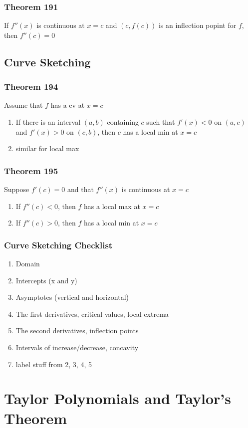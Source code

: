 \documentclass[12pt, letterpaper]{article}
\begin{document}
\subsubsection*{Theorem 191}
If $f''(x)$ is continuous at $x=c$ and $(c,f(c))$ is an inflection popint for $f$, then $f''(c) = 0$
\subsection{Curve Sketching}
\subsubsection*{Theorem 194}
Assume that $f$ has a cv at $x=c$
\begin{enumerate}
    \item If there is an interval $(a,b)$ containing $c$ such that $f'(x) < 0$ on $(a,c)$ and $f'(x) > 0$ on $(c,b)$, then $c$ has a local min at $x=c$
    \item similar for local max
\end{enumerate}
\subsubsection*{Theorem 195}
Suppose $f'(c) = 0$ and that $f''(x)$ is continuous at $x=c$
\begin{enumerate}
    \item If $f''(c) < 0$, then $f$ has a local max at $x=c$
    \item If $f''(c) > 0$, then $f$ has a local min at $x=c$
\end{enumerate}
\subsubsection*{Curve Sketching Checklist}
\begin{enumerate}
    \item Domain 
    \item Intercepts (x and y)
    \item Asymptotes (vertical and horizontal)
    \item The first derivatives, critical values, local extrema
    \item The second derivatives, inflection points
    \item Intervals of increase/decrease, concavity
    \item label stuff from 2, 3, 4, 5
\end{enumerate}


\section{Taylor Polynomials and Taylor's Theorem}
\end{document}
